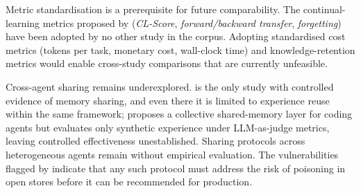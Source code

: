 Metric standardisation is a prerequisite for future comparability.
The continual-learning metrics proposed by
\citet{joshi2025swebenchcl} (\textit{CL-Score},
\textit{forward/backward transfer}, \textit{forgetting}) have been
adopted by no other study in the corpus.
Adopting standardised cost metrics (tokens per task, monetary cost,
wall-clock time) and knowledge-retention metrics would enable
cross-study comparisons that are currently unfeasible.

Cross-agent sharing remains underexplored.
\citet{chen2025sweexp} is the only study with controlled evidence of
memory sharing, and even there it is limited to experience reuse within
the same framework;
\citet{tablan2025smarter} proposes a collective shared-memory layer for
coding agents but evaluates only synthetic experience under LLM-as-judge
metrics, leaving controlled effectiveness unestablished.
Sharing protocols across heterogeneous agents remain without empirical
evaluation.
The vulnerabilities flagged by \citet{srivastava2025memorygraft}
indicate that any such protocol must address the risk of poisoning in
open stores before it can be recommended for production.
